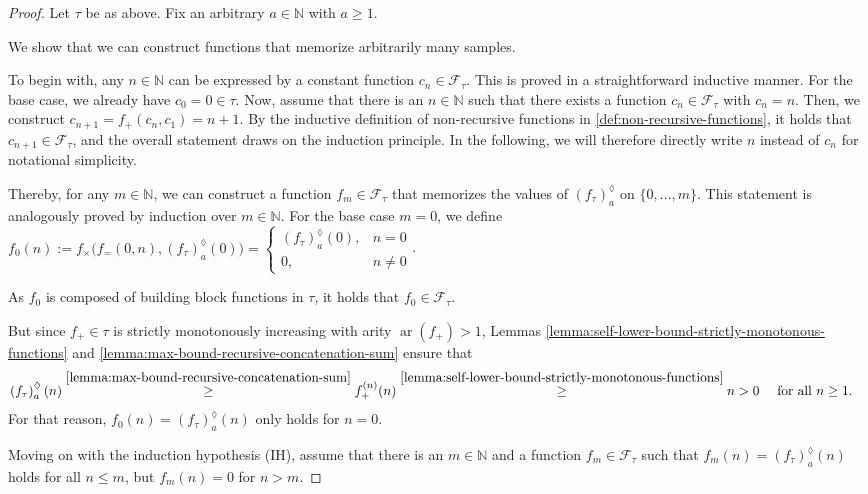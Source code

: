 \begin{proof}
	Let $\tau$ be as above.
	Fix an arbitrary $a\in\mathbb{N}$ with $a\geq 1$.
	
	We show that we can construct functions that memorize arbitrarily many samples.
	
	To begin with, any $n\in\mathbb{N}$ can be expressed by a constant function $c_n\in\mathcal{F}_{\tau}$. This is proved in a straightforward inductive manner.
	For the base case, we already have $c_0=0\in\tau$.
	Now, assume that there is an $n\in\mathbb{N}$ such that there exists a function $c_n\in\mathcal{F}_{\tau}$ with $c_n=n$.
	Then, we construct $c_{n+1}=f_{+}(c_n,c_1)=n+1$.
	By the inductive definition of non-recursive functions in \ref{def:non-recursive-functions}, it holds that $c_{n+1}\in \mathcal{F}_{\tau}$, and the overall statement draws on the induction principle.
	In the following, we will therefore directly write $n$ instead of $c_n$ for notational simplicity.
	
	Thereby, for any $m\in\mathbb{N}$, we can construct a function $f_m\in\mathcal{F}_{\tau}$ that memorizes the values of $\left(f_{\tau}\right)_a^{\lozenge}$ on $\{0,\dots,m\}$.
	This statement is analogously proved by induction over $m\in\mathbb{N}$.
	For the base case $m=0$, we define $f_0(n):=f_{\times}\bigl(f_{=}(0,n),\left(f_{\tau}\right)_a^{\lozenge}(0)\bigr)=\begin{cases}
		\left(f_{\tau}\right)_a^{\lozenge}(0), & n=0\\
		0, & n\neq 0
	\end{cases}$.
	
	As $f_0$ is composed of building block functions in $\tau$, it holds that $f_0\in\mathcal{F}_{\tau}$.
	
	But since $f_{+}\in\tau$ is strictly monotonously increasing with arity $\operatorname{ar}(f_{+})>1$, Lemmas \ref{lemma:self-lower-bound-strictly-monotonous-functions} and \ref{lemma:max-bound-recursive-concatenation-sum} ensure that
	\begin{align}
		\label{eq:lemma-irm-cannot-identify-self-bound-recursive-completion}
		\left(f_{\tau}\right)_a^{\lozenge}(n)&\overset{\ref{lemma:max-bound-recursive-concatenation-sum}}{\geq} f_{+}^{(n)}(n) \overset{\ref{lemma:self-lower-bound-strictly-monotonous-functions}}{\geq} n > 0 && \text{ for all } n\geq 1.
	\end{align}
	For that reason, $f_0(n)=\left(f_{\tau}\right)_a^{\lozenge}(n)$ only holds for $n=0$.
	
	Moving on with the induction hypothesis (IH), assume that there is an $m\in\mathbb{N}$ and a function $f_m\in\mathcal{F}_{\tau}$ such that $f_m(n)=\left(f_{\tau}\right)_a^{\lozenge}(n)$ holds for all $n\leq m$, but $f_m(n)=0$ for $n>m$.
	

\end{proof}
